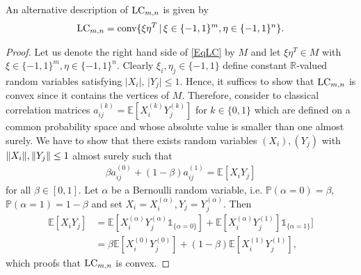 \begin{lemma}\label{LemLC}
	An alternative description of $ \textup{LC}_{m,n} $ is given by 
	\begin{align}\label{EqLC}
		\textup{LC}_{m,n} = \textup{conv} \{  \xi\eta^T \, | \, \xi \in \{-1,1\}^m, \eta \in \{-1,1\}^n     \}.
	\end{align}
\end{lemma}
\begin{proof}
	Let us denote the right hand side of \ref{EqLC} by $ M $ and let $ \xi\eta^T \in M $ with $ \xi \in \{-1,1\}^m, \eta \in \{-1,1\}^n $. Clearly $ \xi_i, \eta_j \in \{-1,1\} $ define constant $ \mathbb{R} $-valued random variables satisfying $ \vert X_i \vert, \, \vert Y_j \vert \le 1 $. Hence, it suffices to show that $ \textup{LC}_{m,n} $ is convex since it contains the vertices of $ M $. Therefore, consider to classical correlation matrices $ a_{ij}^{(k)} = \mathbb{E}[X_i^{(k)}Y_{j}^{(k)}] $ for $ k \in \{0,1\} $ which are defined on a common probability space and whose absolute value is smaller than one almost surely. We have to show that there exists random variables $ (X_i),(Y_j) $ with $  \Vert {X_i} \Vert, \Vert {Y_j} \Vert \le 1 $ almost surely such that
	\begin{align}
		\beta a_{ij}^{(0)}+ (1-\beta)a_{ij}^{(1)} = \mathbb{E}[X_iY_j]
	\end{align}
	for all $ \beta \in [0,1] $.
	Let $ \alpha $ be a Bernoulli random variable, i.e. $ \mathbb{P}(\alpha = 0) = \beta $, $ \mathbb{P}(\alpha = 1) = 1 - \beta$ and set $ X_i = X_i^{(\alpha)}, Y_j = Y_j^{(\alpha)} $.
	Then 
	\begin{align*}
		\mathbb{E}[X_iY_j] &= \mathbb{E}[X_i^{(\alpha)}Y_j^{(\alpha)}  \mathds{1}_{ \{\alpha = 0\}}] + \mathbb{E}[X_i^{(\alpha)}Y_j^{(1)}]\mathds{1}_{\{\alpha = 1\}}] \\
		&= \beta \mathbb{E}[X_i^{(0)}Y_j^{(0)} ] + (1-\beta) \mathbb{E}[X_i^{(1)}Y_j^{(1)}],
	\end{align*} 
	which proofs that $ \textup{LC}_{m,n} $ is convex.
	
	
	

\end{proof}
